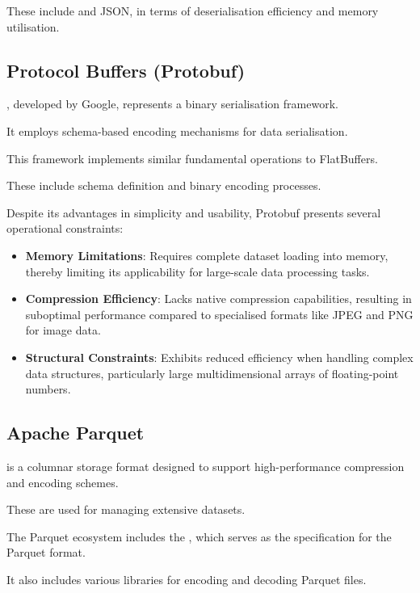 These include \citet{protobuf} and JSON, in terms of deserialisation efficiency and memory utilisation.

\subsection{Protocol Buffers (Protobuf)}
\label{rw:non_geospatial_formats:protobuf}

\citet{protobuf}, developed by Google, represents a binary serialisation framework.

It employs schema-based encoding mechanisms for data serialisation.

This framework implements similar fundamental operations to FlatBuffers.

These include schema definition and binary encoding processes.

Despite its advantages in simplicity and usability, Protobuf presents several operational constraints:

\begin{itemize}
  \item \textbf{Memory Limitations}: Requires complete dataset loading into memory, thereby limiting its applicability for large-scale data processing tasks.
  \item \textbf{Compression Efficiency}: Lacks native compression capabilities, resulting in suboptimal performance compared to specialised formats like JPEG and PNG for image data.
  \item \textbf{Structural Constraints}: Exhibits reduced efficiency when handling complex data structures, particularly large multidimensional arrays of floating-point numbers.
\end{itemize}

\subsection{Apache Parquet}
\label{rw:non_geospatial_formats:parquet}

\citet{parquet} is a columnar storage format designed to support high-performance compression and encoding schemes.

These are used for managing extensive datasets.

The Parquet ecosystem includes the \citet{parquet-format}, which serves as the specification for the Parquet format.

It also includes various libraries for encoding and decoding Parquet files.

